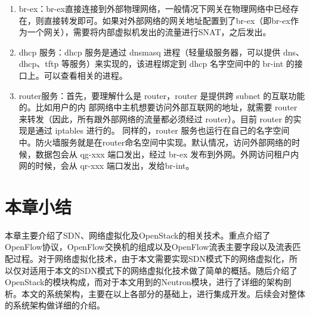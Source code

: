 \begin{enumerate}
\item br-ex：br-ex直接连接到外部物理网络，一般情况下网关在物理网络中已经存在，则直接转发即可。如果对外部网络的网关地址配置到了br-ex（即br-ex作为一个网关），需要将内部虚拟机发出的流量进行SNAT，之后发出。
\item dhcp 服务：dhcp 服务是通过 dnsmasq 进程（轻量级服务器，可以提供 dns、dhcp、tftp 等服务）来实现的，该进程绑定到 dhcp 名字空间中的 br-int 的接口上。可以查看相关的进程。
\item router服务：首先，要理解什么是 router，router 是提供跨 subnet 的互联功能的。比如用户的内
部网络中主机想要访问外部互联网的地址，就需要 router 来转发（因此，所有跟外部网络的流量都必须经过 router）。目前 router 的实现是通过 iptables 进行的。 同样的，router 服务也运行在自己的名字空间中。防火墙服务就是在router命名空间中实现。默认情况，访问外部网络的时候，数据包会从 qg-xxx 端口发出，经过 br-ex 发布到外网。外网访问租户内网的时候，会从 qr-xxx 端口发出，发给br-int。

\end{enumerate}

\section{本章小结}
本章主要介绍了SDN、网络虚拟化及OpenStack的相关技术。重点介绍了OpenFlow协议，OpenFlow交换机的组成以及OpenFlow流表主要字段以及流表匹配过程。对于网络虚拟化技术，由于本文需要实现SDN模式下的网络虚拟化，所以仅对适用于本文的SDN模式下的网络虚拟化技术做了简单的概括。随后介绍了OpenStack的模块构成，而对于本文用到的Neutron模块，进行了详细的架构剖析。本文的系统架构，主要在以上各部分的基础上，进行集成开发。后续会对整体的系统架构做详细的介绍。